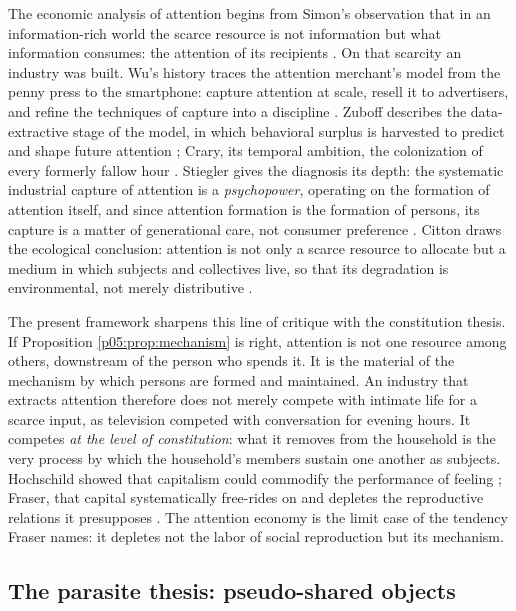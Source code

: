 \documentclass[11pt,a4paper]{article}
\theoremstyle{seriesthm}
\begin{document}
The economic analysis of attention begins from Simon's observation that in an information-rich world the scarce resource is not information but what information consumes: the attention of its recipients \parencite{simon1971}. On that scarcity an industry was built. Wu's history traces the attention merchant's model from the penny press to the smartphone: capture attention at scale, resell it to advertisers, and refine the techniques of capture into a discipline \parencite{wu2016}. Zuboff describes the data-extractive stage of the model, in which behavioral surplus is harvested to predict and shape future attention \parencite{zuboff2019}; Crary, its temporal ambition, the colonization of every formerly fallow hour \parencite{crary2013}. Stiegler gives the diagnosis its depth: the systematic industrial capture of attention is a \emph{psychopower}, operating on the formation of attention itself, and since attention formation is the formation of persons, its capture is a matter of generational care, not consumer preference \parencite{stiegler2010}. Citton draws the ecological conclusion: attention is not only a scarce resource to allocate but a medium in which subjects and collectives live, so that its degradation is environmental, not merely distributive \parencite{citton2017}.

The present framework sharpens this line of critique with the constitution thesis. If Proposition \ref{p05:prop:mechanism} is right, attention is not one resource among others, downstream of the person who spends it. It is the material of the mechanism by which persons are formed and maintained. An industry that extracts attention therefore does not merely compete with intimate life for a scarce input, as television competed with conversation for evening hours. It competes \emph{at the level of constitution}: what it removes from the household is the very process by which the household's members sustain one another as subjects. Hochschild showed that capitalism could commodify the performance of feeling \parencite{hochschild1983}; Fraser, that capital systematically free-rides on and depletes the reproductive relations it presupposes \parencite{fraser2016}. The attention economy is the limit case of the tendency Fraser names: it depletes not the labor of social reproduction but its mechanism.

\subsection{The parasite thesis: pseudo-shared objects}
\label{p05:sec:parasite}
\end{document}

